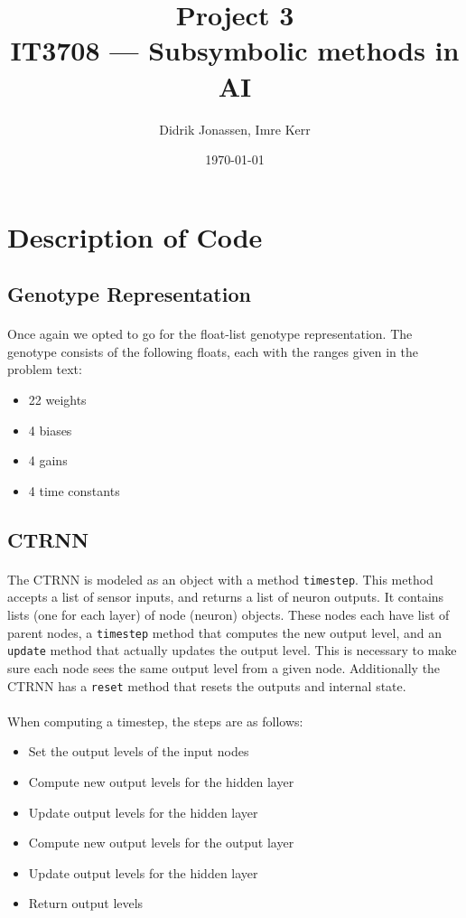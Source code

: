 \documentclass[a4paper,12pt]{article}
\author{Didrik Jonassen, Imre Kerr\vspace{-2ex}}
\title{\vspace{-5ex}Project 3\\ IT3708 --- Subsymbolic methods in AI}
\date{\today}
\begin{document}
\maketitle

\section{Description of Code}
\subsection{Genotype Representation}
\paragraph{}Once again we opted to go for the float-list genotype representation. The genotype consists of the following floats, each with the ranges given in the problem text:
\begin{itemize}
\item{22 weights}
\item{4 biases}
\item{4 gains}
\item{4 time constants}
\end{itemize}

\subsection{CTRNN}
\paragraph{}The CTRNN is modeled as an object with a method \texttt{timestep}. This method accepts a list of sensor inputs, and returns a list of neuron outputs. It contains lists (one for each layer) of node (neuron) objects. These nodes each have list of parent nodes, a \texttt{timestep} method that computes the new output level, and an \texttt{update} method that actually updates the output level. This is necessary to make sure each node sees the same output level from a given node. Additionally the CTRNN has a \texttt{reset} method that resets the outputs and internal state.
\paragraph{}When computing a timestep, the steps are as follows:
\begin{itemize}
\item{Set the output levels of the input nodes}
\item{Compute new output levels for the hidden layer}
\item{Update output levels for the hidden layer}
\item{Compute new output levels for the output layer}
\item{Update output levels for the hidden layer}
\item{Return output levels}
\end{itemize}
\end{document}
